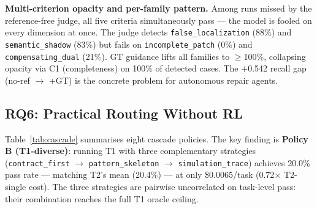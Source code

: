 \documentclass[sigconf,review,anonymous]{acmart}
\begin{document}
\begin{table}[t]
\centering
\caption{Verifier comparison. Ground truth = semantic audit judgment (all 72 passes incomplete). LLM judge: VERDICT = PASS only if all five criteria hold. ``+GT'' = ground-truth patch as reference.}
\label{tab:verifier}
\end{table}

\textbf{Multi-criterion opacity and per-family pattern.} Among runs missed by the reference-free judge, all five criteria simultaneously pass — the model is fooled on every dimension at once. The judge detects \texttt{false\_localization} (88\%) and \texttt{semantic\_shadow} (83\%) but fails on \texttt{incomplete\_patch} (0\%) and \texttt{compensating\_dual} (21\%). GT guidance lifts all families to $\geq$100\%, collapsing opacity via C1 (completeness) on 100\% of detected cases. The $+$0.542 recall gap (no-ref $\to$ +GT) is the concrete problem for autonomous repair agents.

\subsection{RQ6: Practical Routing Without RL}
\label{sec:rq6}

Table~\ref{tab:cascade} summarises eight cascade policies. The key finding is \textbf{Policy B (T1-diverse)}: running T1 with three complementary strategies (\texttt{contract\_first} $\to$ \texttt{pattern\_skeleton} $\to$ \texttt{simulation\_trace}) achieves 20.0\% pass rate — matching T2's mean (20.4\%) — at only \$0.0065/task (0.72$\times$ T2-single cost). The three strategies are pairwise uncorrelated on task-level pass: their combination reaches the full T1 oracle ceiling.
\end{document}
